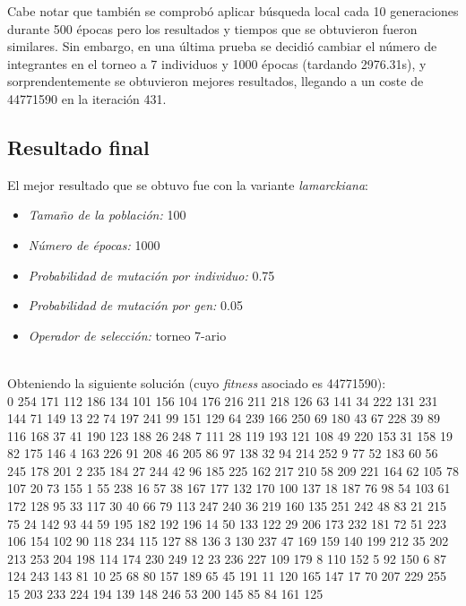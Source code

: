 Cabe notar que también se comprobó aplicar búsqueda local cada 10 generaciones durante 500 épocas pero los resultados y tiempos que se obtuvieron fueron similares. Sin embargo, en una última prueba se decidió cambiar el número de integrantes en el torneo a 7 individuos y 1000 épocas (tardando 2976.31s), y sorprendentemente se obtuvieron mejores resultados, llegando a un coste de 44771590 en la iteración 431. 

\subsection{Resultado final}

El mejor resultado que se obtuvo fue con la variante \textit{lamarckiana}:

\begin{itemize}
	\item \textit{Tamaño de la población:} 100
	
	\item \textit{Número de épocas:} 1000
	
	\item \textit{Probabilidad de mutación por individuo:} 0.75
	
	\item \textit{Probabilidad de mutación por gen:} 0.05
	
	\item \textit{Operador de selección:} torneo 7-ario
	
\end{itemize}

\quad\\

Obteniendo la siguiente solución (cuyo \textit{fitness} asociado es 44771590):\\

0 254 171 112 186 134 101 156 104 176 216 211 218 126 63 141 34 222 131 231 144 71 149 13 22 74 197 241 99 151 129 64 239 166 250 69 180 43 67 228 39 89 116 168 37 41 190 123 188 26 248 7 111 28 119 193 121 108 49 220 153 31 158 19 82 175 146 4 163 226 91 208 46 205 86 97 138 32 94 214 252 9 77 52 183 60 56 245 178 201 2 235 184 27 244 42 96 185 225 162 217 210 58 209 221 164 62 105 78 107 20 73 155 1 55 238 16 57 38 167 177 132 170 100 137 18 187 76 98 54 103 61 172 128 95 33 117 30 40 66 79 113 247 240 36 219 160 135 251 242 48 83 21 215 75 24 142 93 44 59 195 182 192 196 14 50 133 122 29 206 173 232 181 72 51 223 106 154 102 90 118 234 115 127 88 136 3 130 237 47 169 159 140 199 212 35 202 213 253 204 198 114 174 230 249 12 23 236 227 109 179 8 110 152 5 92 150 6 87 124 243 143 81 10 25 68 80 157 189 65 45 191 11 120 165 147 17 70 207 229 255 15 203 233 224 194 139 148 246 53 200 145 85 84 161 125 

